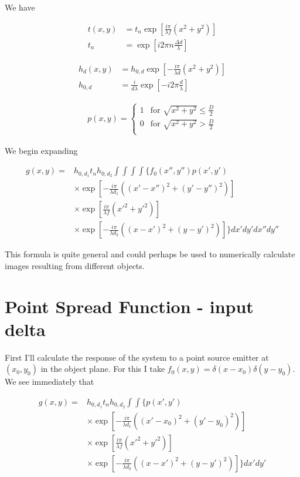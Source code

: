 \documentclass[12pt]{article}
\begin{document}
We have

\begin{align}
t(x,y) &= t_n \exp\left[ \frac{i\pi}{\lambda f}(x^2+y^2)\right]\\
t_n &= \exp\left[i 2\pi n\frac{\Delta d}{\lambda} \right]
\end{align}

\begin{align}
h_d(x,y) &= h_{0,d} \exp\left[-\frac{i\pi}{\lambda d} (x^2+y^2)\right]\\
h_{0,d} &= \frac{i}{d \lambda} \exp\left[ -i 2\pi \frac{d}{\lambda}\right]
\end{align}

\begin{align}
p(x,y) = 
\begin{cases}
1 & \text{for } \sqrt{x^2+y^2} \le \frac{D}{2}\\
0 & \text{for } \sqrt{x^2+y^2} > \frac{D}{2}\\
\end{cases}
\end{align}

We begin expanding

\begin{align}
g(x,y) =& h_{0,d_1} t_n h_{0,d_2} \int\int\int\int \Bigg\{f_0(x'',y'')p(x',y')\\
&\times \exp\left[-\frac{i\pi}{\lambda d_1} ((x'-x'')^2+(y'-y'')^2)\right]\\
&\times \exp\left[ \frac{i\pi}{\lambda f}(x'^2+y'^2)\right]\\
&\times \exp\left[-\frac{i\pi}{\lambda d_2} ((x-x')^2+(y-y')^2)\right] \Bigg\} dx'dy'dx''dy''
\end{align}

This formula is quite general and could perhaps be used to numerically calculate images resulting from different objects.

\section{Point Spread Function - input delta}
First I'll calculate the response of the system to a point source emitter at $(x_0,y_0)$ in the object plane. For this I take $f_0(x,y) = \delta(x-x_0)\delta(y-y_0)$. We see immediately that

\begin{align}
g(x,y) =& h_{0,d_1} t_n h_{0,d_2} \int\int \Bigg\{p(x',y')\\
&\times \exp\left[-\frac{i\pi}{\lambda d_1} ((x'-x_0)^2+(y'-y_0)^2)\right]\\
&\times \exp\left[ \frac{i\pi}{\lambda f}(x'^2+y'^2)\right]\\
&\times \exp\left[-\frac{i\pi}{\lambda d_2} ((x-x')^2+(y-y')^2)\right] \Bigg\} dx'dy'
\end{align}
\end{document}

